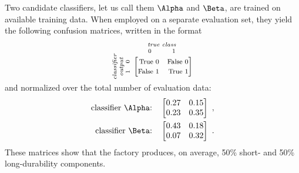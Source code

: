 \documentclass[\ifafour a4paper,12pt,\else a5paper,10pt,\fi%
onecolumn,oneside,article,%
british%
]{memoir}
\theoremstyle{remark}
\theoremstyle{innote}
\renewcommand*{\|}[1][]{\nonscript\:#1\vert\nonscript\:\mathopen{}}
\newcommand*{\umatrix}[4]{\begin{bmatrix*}[r]#1&#2\\#3&#4\end{bmatrix*}}
\begin{document}
Two candidate classifiers, let us call them $\Alpha$ and $\Beta$, are trained on available training data. When employed on a separate evaluation set, they yield the following confusion matrices, written in the format
\begin{equation*}
  \rotatebox[origin=c]{90}{
    \clap{\textit{\parbox{5em}{\centering\scriptsize classifier\\output\\$1\quad 0$}}
    }}\ 
    \overbracket[0pt]{
      \umatrix{
    \text{\footnotesize True 0} }{ \text{\footnotesize False 0}}{
    \text{\footnotesize False 1} }{ \text{\footnotesize True 1}}
      }^{
      \clap{\textit{\parbox{6em}{\centering\scriptsize true class\\$0\hspace{3em}1$}}
    }}
\end{equation*}
and normalized over the total number of evaluation data:
\begin{align}
  \label{eq:CM_A}
\text{classifier $\Alpha$:}\quad  \umatrix{
    0.27 }{ 0.15 }{ 0.23 }{ 0.35
  }
\ ,
  \\
  \label{eq:CM_B}
\text{classifier $\Beta$:}\quad  \umatrix{
    0.43 }{ 0.18 }{ 0.07 }{ 0.32
  }
\ .
\end{align}
These matrices show that the factory produces, on average, 50\% short- and 50\% long-durability components.
\end{document}
